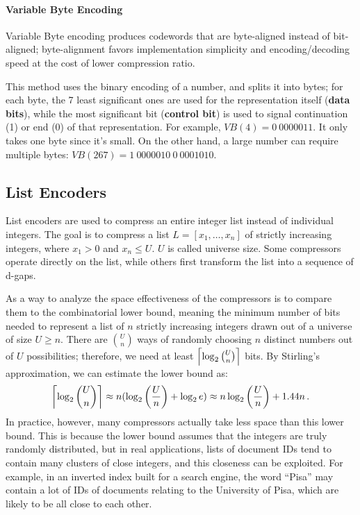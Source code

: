 \paragraph{Variable Byte Encoding}

Variable Byte encoding produces codewords that are byte-aligned instead of bit-aligned; byte-alignment favors implementation simplicity and encoding/decoding speed at the cost of lower compression ratio. 

This method uses the binary encoding of a number, and splits it into bytes; for each byte, the 7 least significant ones are used for the representation itself (\textbf{data bits}), while the most significant bit (\textbf{control bit}) is used to signal continuation (1) or end (0) of that representation. For example, $VB(4) = 0 \ 0000011$. It only takes one byte since it's small. On the other hand, a large number can require multiple bytes: $\textit{VB}(267) = 1 \ 0000010 \ 0 \ 0001010$.

\subsection{List Encoders}

List encoders are used to compress an entire integer list instead of individual integers. The goal is to compress a list $L = [x_1, \dots, x_n]$ of strictly increasing integers, where $x_1 > 0$ and $x_n \leq U$. $U$ is called universe size. Some compressors operate directly on the list, while others first transform the list into a sequence of d-gaps.

As a way to analyze the space effectiveness of the compressors is to compare them to the combinatorial lower bound, meaning the minimum number of bits needed to represent a list of $n$ strictly increasing integers drawn out of a universe of size $U \geq n$. There are $\binom{U}{n}$ ways of randomly choosing $n$ distinct numbers out of $U$ possibilities; therefore, we need at least $\left\lceil\log_2 \binom{U}{n}\right\rceil$ bits. By Stirling's approximation, we can estimate the lower bound as:
\begin{equation*}
    \left\lceil\log_2 \binom{U}{n}\right\rceil \approx n (\log_2 \left(\frac{U}{n}\right) + \log_2 e) \approx n \log_2 \left(\frac{U}{n}\right) + 1.44 n \,.
\end{equation*}
In practice, however, many compressors actually take less space than this lower bound. This is because the lower bound assumes that the integers are truly randomly distributed, but in real applications, lists of document IDs tend to contain many clusters of close integers, and this closeness can be exploited. For example, in an inverted index built for a search engine, the word ``Pisa'' may contain a lot of IDs of documents relating to the University of Pisa, which are likely to be all close to each other.

